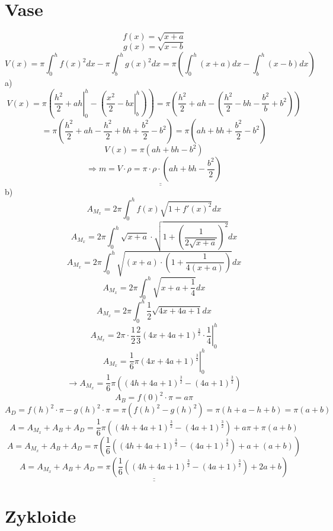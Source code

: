 \section{Vase}
\[ f(x) = \sqrt{x+a} \]
\[ g(x) = \sqrt{x-b} \]
\[ V(x) = \pi \int_0^h f(x)^2 dx - \pi \int_b^h g(x)^2dx = \pi \left( \int_0^h (x+a) dx - \int_b^h (x-b) dx\right) \]
a)
\[ V(x) = \pi\left(\left. \frac{h^2}{2} + ah \right|_0^h - \left(\left. \frac{x^2}{2} - bx \right|_b^h \right) \right) = \pi \left(  \frac{h^2}{2} + ah - \left( \frac{h^2}{2} - bh - \frac{b^2}{b} + b^2 \right)\right) \]
\[ = \pi \left(\frac{h^2}{2} + ah - \frac{h^2}{2} + bh + \frac{b^2}{2} - b^2\right) = \pi \left(ah + bh + \frac{b^2}{2} - b^2\right) \]
\[ V(x) = \pi \left(ah + bh - b^2\right) \]
\[ \Rightarrow \underline{\underline{m = V \cdot \rho = \pi \cdot \rho \cdot \left(ah + bh - \frac{b^2}{2}\right)}} \]
b)
\[ A_{M_x} = 2 \pi \int_0^h f(x) \sqrt{1 + f'(x)^2} dx \]
\[ A_{M_x} = 2 \pi \int_0^h \sqrt{x + a} \cdot \sqrt{1 + \left( \frac{1}{2 \sqrt{x + a}} \right)^2} dx \]
\[ A_{M_x} = 2 \pi \int_0^h \sqrt{(x + a) \cdot \left(1 + \frac{1}{4 (x + a)} \right)} dx \]
\[ A_{M_x} = 2 \pi \int_0^h \sqrt{x + a + \frac{1}{4}} dx \]
\[ A_{M_x} = 2 \pi \int_0^h \frac{1}{2} \sqrt{4x + 4a + 1} dx \]
\[ A_{M_x} = \left. 2 \pi \cdot \frac{1}{2} \frac{2}{3}\left( 4x + 4a + 1 \right)^{\frac{3}{2}} \cdot \frac{1}{4} \right|_0^h \]
\[ A_{M_x} = \left. \frac{1}{6} \pi \left(4x + 4a + 1\right)^{\frac{3}{2}} \right|_0^h \]
\[ \rightarrow A_{M_x} = \frac{1}{6} \pi \left(\left( 4h + 4a + 1 \right)^{\frac{3}{2}} - \left(4a + 1\right)^{\frac{3}{2}}\right) \]
\[ A_B = f(0)^2 \cdot \pi = a \pi \]
\[ A_D = f(h)^2 \cdot \pi - g(h)^2 \cdot \pi = \pi \left( f(h)^2 - g(h)^2 \right) = \pi \left( h + a - h + b \right) = \pi \left( a + b \right) \]
\[ A =  A_{M_x} + A_B + A_D = \frac{1}{6} \pi \left(\left( 4h + 4a + 1 \right)^{\frac{3}{2}} - \left(4a + 1\right)^{\frac{3}{2}}\right) + a \pi + \pi \left( a + b \right) \]
\[ A =  A_{M_x} + A_B + A_D = \pi \left(\frac{1}{6} \left(\left( 4h + 4a + 1 \right)^{\frac{3}{2}} - \left(4a + 1\right)^{\frac{3}{2}}\right) + a + \left( a + b \right)\right) \]
\[ \underline{\underline{A =  A_{M_x} + A_B + A_D = \pi \left(\frac{1}{6} \left(\left( 4h + 4a + 1 \right)^{\frac{3}{2}} - \left(4a + 1\right)^{\frac{3}{2}}\right) + 2a + b\right)}} \]

\section{Zykloide}
\[  \]

